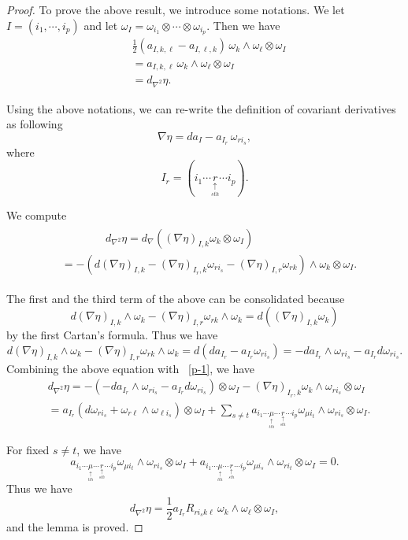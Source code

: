\begin{proof} To prove the above result, we introduce some notations. We let $I=(i_1,\cdots,i_p)$ and 
let $\omega_I=\omega_{i_1}\otimes\cdots\otimes\omega_{i_p}$.
 Then we have
\begin{align*}
&\frac 12(a_{I,k,\ell}-a_{I,\ell,k})\,\omega_k\wedge\omega_\ell\otimes \omega_I\\
&=a_{I,k,\ell}\,\omega_k\wedge\omega_\ell\otimes\omega_I\\
&=d_{\nabla^2}\eta.
\end{align*}


Using the above notations, we can re-write the definition of covariant derivatives as following
\[
\nabla\eta=d a_I-a_{I_r}\,\omega_{r i_s},
\]
where 
\[
I_r=(i_1\cdots  \underset{\underset{sth}{\uparrow}}r\cdots i_p).
\]

We compute 
\begin{align}\label{p-1}
\begin{split}
&\qquad\qquad d_{\nabla^2}\eta=d_\nabla\left((\nabla\eta)_{I,k}\omega_k\otimes\omega_I\right)\\
&=-\left(d(\nabla\eta)_{I,k}-(\nabla\eta)_{I_r,k}\omega_{r i_s}-(\nabla\eta)_{I,r}\omega_{rk}\right)\wedge
\omega_k\otimes\omega_I.
\end{split}
\end{align}

The first and the third term of the above can be consolidated because
\[
d(\nabla\eta)_{I,k}\wedge\omega_k-(\nabla\eta)_{I,r}\omega_{rk}\wedge\omega_k
=d((\nabla\eta)_{I,k}\omega_k)
\]
by the first Cartan's formula.  
Thus we have
\[
d(\nabla\eta)_{I,k}\wedge\omega_k-(\nabla\eta)_{I,r}\omega_{rk}\wedge\omega_k
=d(d a_{I_r}-a_{I_r}\omega_{ri_s})=-da_{I_r}\wedge\omega_{r i_s}-a_{I_r}d\omega_{r i_s}.
\]
Combining the above equation with ~\eqref{p-1}, we have
\begin{align*}
&
d_{\nabla^2}\eta=-(-da_{I_r}\wedge\omega_{r i_s}-a_{I_r}d\omega_{r i_s})\otimes \omega_I
-(\nabla\eta)_{I_r,k}\omega_k\wedge\omega_{r i_s}\otimes\omega_I\\
&=a_{I_r}(d\omega_{r i_s}+\omega_{r\ell}\wedge\omega_{\ell i_s})\otimes\omega_I+\sum_{s\neq t}a_{i_1\cdots  \underset{\underset{tth}{\uparrow}}\mu\cdots
 \underset{\underset{sth}{\uparrow}}r\cdots i_p}\omega_{\mu i_t}\wedge
 \omega_{r i_s}\otimes\omega_I.
\end{align*}


For fixed $s\neq t$, we have
\[
a_{i_1\cdots  \underset{\underset{tth}{\uparrow}}\mu\cdots
 \underset{\underset{sth}{\uparrow}}r\cdots i_p}\omega_{\mu i_t}\wedge
 \omega_{r i_s}\otimes\omega_I+a_{i_1\cdots  \underset{\underset{tth}{\uparrow}}\mu\cdots
 \underset{\underset{sth}{\uparrow}}r\cdots i_p}\omega_{\mu i_s}\wedge
 \omega_{r i_t}\otimes\omega_I=0.
 \]
 Thus we have
 \[
 d_{\nabla^2}\eta=\frac 12 a_{I_r}R_{r i_sk\ell}\,\omega_k\wedge\omega_\ell\otimes\omega_I,
 \]
 and the lemma is proved.
 
\end{proof}
 
